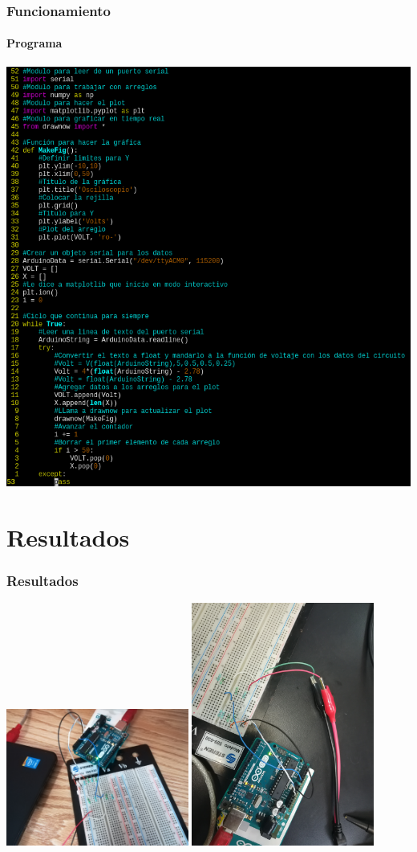\documentclass{beamer}
\begin{document}
\begin{frame}
\frametitle{Funcionamiento}
\framesubtitle{Programa}
\centering
\includegraphics[height=0.8\textheight]{CodPy.png}
\end{frame}

\section{Resultados}
\begin{frame}
\frametitle{Resultados}
\centering
\includegraphics[width=0.45\textwidth]{Cir1.jpg}
\includegraphics[width=0.45\textwidth]{Cir2.jpg}
\end{frame}
\end{document}
